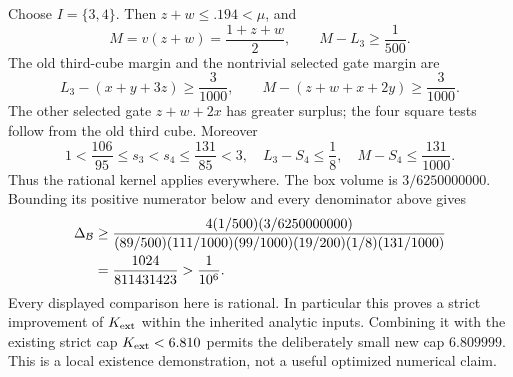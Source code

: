 Choose \(I=\{3,4\}\).
Then \(z+w\le.194<\mu\), and
\[
 M=v(z+w)=\frac{1+z+w}{2},\qquad M-L_3\ge\frac1{500}.
\]
The old third-cube margin and the nontrivial selected gate margin are
\[
 L_3-(x+y+3z)\ge\frac3{1000},\qquad
 M-(z+w+x+2y)\ge\frac3{1000}.
\]
The other selected gate \(z+w+2x\) has greater surplus;
the four square tests follow from the old third cube.
Moreover
\[
 1<\frac{106}{95}\le s_3<s_4\le\frac{131}{85}<3,
 \quad L_3-S_4\le\frac18,\quad M-S_4\le\frac{131}{1000}.
\]
Thus the rational kernel applies everywhere.
The box volume is \(3/6250000000\).
Bounding its positive numerator below and every denominator above gives
\begin{align}
 \Delta_{\mathcal B}
 &\ge
 \frac{4(1/500)(3/6250000000)}
 {(89/500)(111/1000)(99/1000)(19/200)(1/8)(131/1000)}
 \notag\\
 &=\frac{1024}{811431423}>\frac1{10^6}.
 \label{eq:fourth-prefix-exact-small-gain}
\end{align}
Every displayed comparison here is rational.
In particular this proves a strict improvement of \(K_{\rm ext}\)
within the inherited analytic inputs.
Combining it with the existing strict cap \(K_{\rm ext}<6.810\)
permits the deliberately small new cap \(6.809999\).
This is a local existence demonstration, not a useful optimized
numerical claim.


